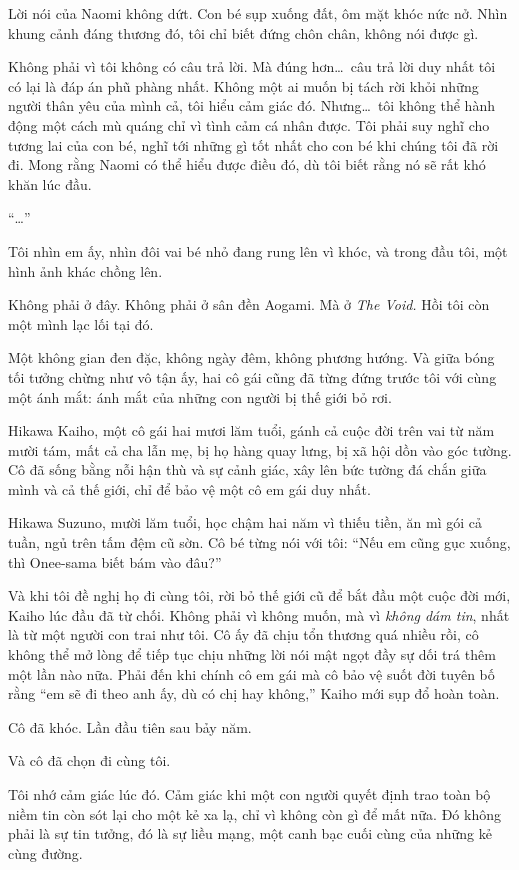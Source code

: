 \documentclass[../main.tex]{subfiles}
\begin{document}
Lời nói của Naomi không dứt. Con bé sụp xuống đất, ôm mặt khóc nức nở. Nhìn khung cảnh đáng thương đó, tôi chỉ biết đứng chôn chân, không nói được gì.

Không phải vì tôi không có câu trả lời. Mà đúng hơn\dots\ câu trả lời duy nhất tôi có lại là đáp án phũ phàng nhất. Không một ai muốn bị tách rời khỏi những người thân yêu của mình cả, tôi hiểu cảm giác đó. Nhưng\dots\ tôi không thể hành động một cách mù quáng chỉ vì tình cảm cá nhân được. Tôi phải suy nghĩ cho tương lai của con bé, nghĩ tới những gì tốt nhất cho con bé khi chúng tôi đã rời đi. Mong rằng Naomi có thể hiểu được điều đó, dù tôi biết rằng nó sẽ rất khó khăn lúc đầu.

``\dots''

Tôi nhìn em ấy, nhìn đôi vai bé nhỏ đang rung lên vì khóc, và trong đầu tôi, một hình ảnh khác chồng lên.

Không phải ở đây. Không phải ở sân đền Aogami. Mà ở \emph{The Void.} Hồi tôi còn một mình lạc lối tại đó.

Một không gian đen đặc, không ngày đêm, không phương hướng. Và giữa bóng tối tưởng chừng như vô tận ấy, hai cô gái cũng đã từng đứng trước tôi với cùng một ánh mắt: ánh mắt của những con người bị thế giới bỏ rơi.

Hikawa Kaiho, một cô gái hai mươi lăm tuổi, gánh cả cuộc đời trên vai từ năm mười tám, mất cả cha lẫn mẹ, bị họ hàng quay lưng, bị xã hội dồn vào góc tường. Cô đã sống bằng nỗi hận thù và sự cảnh giác, xây lên bức tường đá chắn giữa mình và cả thế giới, chỉ để bảo vệ một cô em gái duy nhất.

Hikawa Suzuno, mười lăm tuổi, học chậm hai năm vì thiếu tiền, ăn mì gói cả tuần, ngủ trên tấm đệm cũ sờn. Cô bé từng nói với tôi: ``Nếu em cũng gục xuống, thì Onee-sama biết bám vào đâu?''

Và khi tôi đề nghị họ đi cùng tôi, rời bỏ thế giới cũ để bắt đầu một cuộc đời mới, Kaiho lúc đầu đã từ chối. Không phải vì không muốn, mà vì \emph{không dám tin}, nhất là từ một người con trai như tôi. Cô ấy đã chịu tổn thương quá nhiều rồi, cô không thể mở lòng để tiếp tục chịu những lời nói mật ngọt đầy sự dối trá thêm một lần nào nữa. Phải đến khi chính cô em gái mà cô bảo vệ suốt đời tuyên bố rằng ``em sẽ đi theo anh ấy, dù có chị hay không,'' Kaiho mới sụp đổ hoàn toàn.

Cô đã khóc. Lần đầu tiên sau bảy năm.

Và cô đã chọn đi cùng tôi.

Tôi nhớ cảm giác lúc đó. Cảm giác khi một con người quyết định trao toàn bộ niềm tin còn sót lại cho một kẻ xa lạ, chỉ vì không còn gì để mất nữa. Đó không phải là sự tin tưởng, đó là sự liều mạng, một canh bạc cuối cùng của những kẻ cùng đường.
\end{document}

